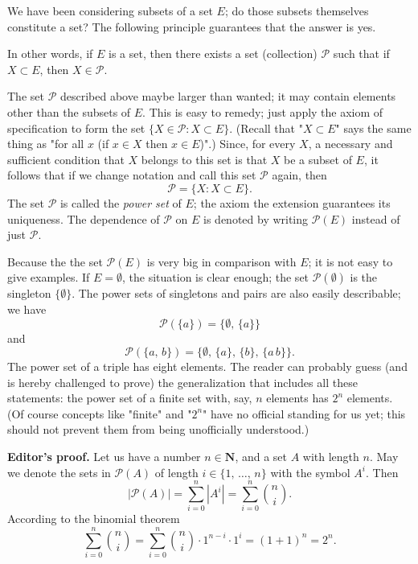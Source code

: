 We have been considering subsets of a set $E$; do those subsets themselves constitute a set? The following principle guarantees that the answer is yes.


In other words, if $E$ is a set, then there exists a set (collection) $\mathcal{P}$ such that if $X \subset E$, then $X \in \mathcal{P}$.

The set $\mathcal{P}$ described above maybe larger than wanted; it may contain elements other than the subsets of $E$. This is easy to remedy; just apply the axiom of specification to form the set $\{X \in \mathcal{P} : X \subset E\}$. (Recall that "$X \subset E$" says the same thing as "for all $x$ (if $x \in X$ then $x \in E$)".) Since, for every $X$, a necessary and sufficient condition that $X$ belongs to this set is that $X$ be a subset of $E$, it follows that if we change notation and call this set $\mathcal{P}$ again, then
\[
	\mathcal{P} = \{ X : X \subset E\}.
\]
The set $\mathcal{P}$ is called the \textit{power set} of $E$; the axiom the extension guarantees its uniqueness. The dependence of $\mathcal{P}$ on $E$ is denoted by writing $\mathcal{P}(E)$ instead of just $\mathcal{P}$.

Because the the set $\mathcal{P}(E)$ is very big in comparison with $E$; it is not easy to give examples. If $E = \emptyset$, the situation is clear enough; the set $\mathcal{P}(\emptyset)$ is the singleton $\{\emptyset\}$. The power sets of singletons and pairs are also easily describable; we have
\[
	\mathcal{P}(\{a\}) = \{\emptyset, \, \{a\}\}
\]
and
\[
	\mathcal{P}(\{a, \, b\}) = \{ \emptyset, \, \{a\}, \, \{b\}, \, \{a \, b\}\}.
\]
The power set of a triple has eight elements. The reader can probably guess (and is hereby challenged to prove) the generalization that includes all these statements: the power set of a finite set with, say, $n$ elements has $2^n$ elements. (Of course concepts like "finite" and "$2^n$" have no official standing for us yet; this should not prevent them from being unofficially understood.)

\textbf{Editor's proof.} Let us have a number $n \in \mathbf{N}$, and a set $A$ with length $n$. May we denote the sets in $\mathcal{P}(A)$ of length $i \in \{ 1, \, \dots, \, n\}$ with the symbol $A^i$. Then 
\[
	|\mathcal{P}(A)| = \sum_{i = 0}^{n} |A^i| = \sum_{i = 0}^{n} \binom{n}{i}.
\]
According to the binomial theorem
\[
	\sum_{i=0}^n \binom{n}{i} = \sum_{i=0}^n \binom{n}{i}\cdot 1^{n-i} \cdot 1^i = (1+1)^n = 2^n.
\]

